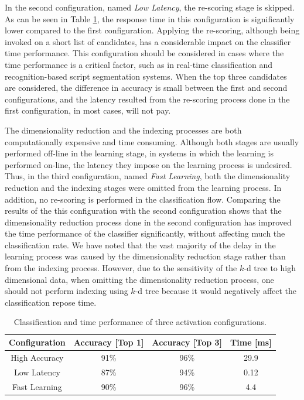 In the second configuration, named \emph{Low Latency}, the re-scoring stage is skipped.
As can be seen in Table \ref{table:configurations}, the response time in this configuration is significantly lower compared to the first configuration.
Applying the re-scoring, although being invoked on a short list of candidates, has a considerable impact on the classifier time performance. 
This configuration should be considered in cases where the time performance is a critical factor, such as in real-time classification and recognition-based script segmentation systems.
When the top three candidates are considered, the difference in accuracy is small between the first and second configurations, and the latency resulted from the re-scoring process done in the first configuration, in most cases, will not pay. 

The dimensionality reduction and the indexing processes are both computationally expensive and time consuming. 
Although both stages are usually performed off-line in the learning stage, in systems in which the learning is performed on-line, the latency they impose on the learning process is undesired.
Thus, in the third configuration, named \emph{Fast Learning}, both the dimensionality reduction and the indexing stages were omitted from the learning process.
In addition, no re-scoring is performed in the classification flow.
Comparing the results of the this configuration with the second configuration shows that the dimensionality reduction process done in the second configuration has improved the time performance of the classifier significantly, without affecting much the classification rate.
We have noted that the vast majority of the delay in the learning process was caused by the dimensionality reduction stage rather than from the indexing process.
However, due to the sensitivity of the $k$-d tree to high dimensional data, when omitting the dimensionality reduction process, one should not perform indexing using $k$-d tree because it would negatively affect the classification repose time.

\begin{table}
\centering
\caption{Classification and time performance of three activation configurations.}
\renewcommand{\arraystretch}{1.2}
\begin{tabular}{ c c c c }
  \toprule
  \textbf{Configuration}  & \textbf{Accuracy [Top 1]}  & \textbf{Accuracy [Top 3]} & \textbf{Time [ms]}\\
  \midrule
  High Accuracy & 91\% & 96\% & 29.9 \\ 
  Low Latency   & 87\% & 94\% & 0.12 \\
  Fast Learning & 90\% & 96\% & 4.4 \\ 
  \bottomrule
\end{tabular}
\label{table:configurations} 
\end{table}

